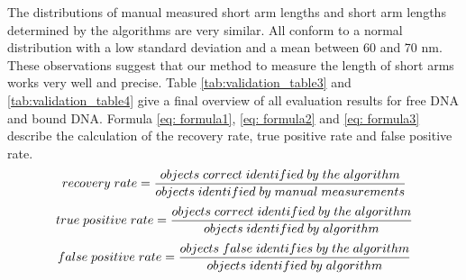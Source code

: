 \documentclass{article}
\begin{document}
The distributions of manual measured short arm lengths and short arm lengths determined by the algorithms are very similar. All conform to a normal distribution with a low standard deviation and a mean between 60 and 70 nm. These observations suggest that our method to measure the length of short arms works very well and precise. Table \ref{tab:validation_table3} and \ref{tab:validation_table4} give a final overview of all evaluation results for free DNA and bound DNA. Formula \ref{eq: formula1}, \ref{eq: formula2} and \ref{eq: formula3} describe the calculation of the recovery rate, true positive rate and false positive rate. \\
%
\begin{equation}
recovery \; rate = \dfrac{objects \; correct \; identified \; by \; the \; algorithm}{objects \; identified \; by \; manual \; measurements} \\
\label{eq: formula1}
\end{equation}
%
\begin{equation}
true \; positive \; rate = \dfrac{objects \; correct \; identified \; by \; the \; algorithm}{objects \; identified \; by \; algorithm} \\
\label{eq: formula2}
\end{equation}
%
\begin{equation}
false \; positive \; rate = \dfrac{objects \; false \; identifies \; by \; the \; algorithm}{objects \; identified \; by \; algorithm} \\
\label{eq: formula3}
\end{equation}
\end{document}
